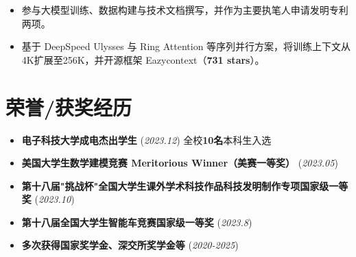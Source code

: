 \documentclass{resume}
\begin{document}
\begin{itemize}
    \item 参与大模型训练、数据构建与技术文档撰写，并作为主要执笔人申请发明专利两项。
\end{itemize}

\begin{itemize}
    \item 基于 DeepSpeed Ulysses 与 Ring Attention 等序列并行方案，将训练上下文从4K扩展至256K，并开源框架 Eazycontext（\textbf{731 stars}）。
\end{itemize}

\section{荣誉/获奖经历}
\begin{itemize}[parsep=0.2ex]
    \item \textbf{电子科技大学成电杰出学生} (\textit{2023.12}) 全校\textbf{10名}本科生入选
    \item \textbf{美国大学生数学建模竞赛 Meritorious Winner（美赛一等奖）} (\textit{2023.05}) 
    \item \textbf{第十八届"挑战杯"全国大学生课外学术科技作品科技发明制作专项国家级一等奖} (\textit{2023.10})
    \item \textbf{第十八届全国大学生智能车竞赛国家级一等奖} (\textit{2023.8})
    \item \textbf{多次获得国家奖学金、深交所奖学金等} (\textit{2020-2025})
\end{itemize}


%
%
\end{document}
